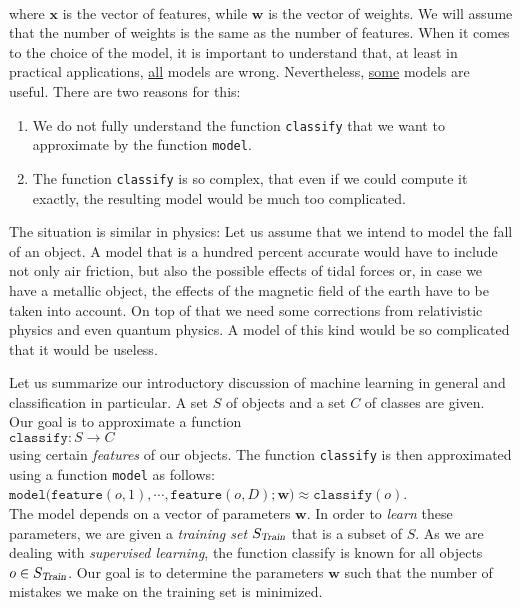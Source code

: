 \\[0.2cm]
where $\mathbf{x}$ is the vector of features, while $\mathbf{w}$ is the vector of weights.  We will assume that the
number of weights is the same as the number of features.  When it comes to the choice of the model, it is important to
understand that, at least in practical applications, \underline{all} models are wrong.  Nevertheless, \underline{some}
models are useful.  There are two reasons for this:
\begin{enumerate}
\item We do not fully understand the function \texttt{classify} that we want to approximate by the function \texttt{model}.
\item The function \texttt{classify} is so complex, that even if we could compute it exactly, the resulting model 
      would be much too complicated.
\end{enumerate}
The situation is similar in physics: Let us assume that we intend to model the fall of an object.  A model that is a
hundred percent accurate would have to include not only air friction, but also the possible effects of tidal forces or,
in case we have a metallic object, the effects of the magnetic field of the earth have to be taken into account.  On top
of that we need some corrections from relativistic physics and even quantum physics.  A model of this kind
would be so complicated that it would be useless. 


Let us summarize our introductory discussion of machine learning in general and classification in particular.
A set $S$ of objects and a set $C$ of classes are given.  Our goal is to approximate a function
\\[0.2cm]
\hspace*{1.3cm}
$\mathtt{classify}: S \rightarrow C$
\\[0.2cm]
using certain \emph{features} of our objects.  The function \texttt{classify} is then approximated using a function
\texttt{model} as follows:
\\[0.2cm]
\hspace*{1.3cm}
$\mathtt{model}\bigl(\mathtt{feature}(o,1), \cdots, \mathtt{feature}(o,D); \mathbf{w}\bigr) \approx \mathtt{classify}(o)$.
\\[0.2cm]
The model depends on a vector of parameters $\mathbf{w}$.  In order to \emph{learn} these parameters, we are given a 
\emph{training set} $S_\textsl{Train}$ that is a subset of $S$.  As we are dealing with \emph{supervised learning}, the function 
classify is known for all objects $o \in S_\textsl{Train}$.   Our goal is to determine the parameters $\mathbf{w}$ such that the
number of mistakes we make on the training set is minimized.  

